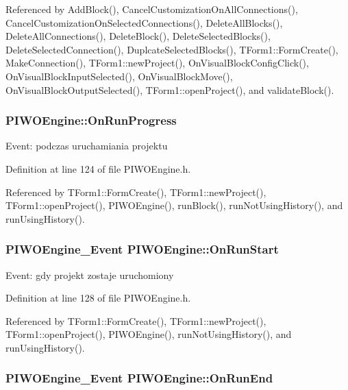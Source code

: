 Referenced by AddBlock(), CancelCustomizationOnAllConnections(), CancelCustomizationOnSelectedConnections(), DeleteAllBlocks(), DeleteAllConnections(), DeleteBlock(), DeleteSelectedBlocks(), DeleteSelectedConnection(), DuplcateSelectedBlocks(), TForm1::FormCreate(), MakeConnection(), TForm1::newProject(), OnVisualBlockConfigClick(), OnVisualBlockInputSelected(), OnVisualBlockMove(), OnVisualBlockOutputSelected(), TForm1::openProject(), and validateBlock().\hypertarget{classPIWOEngine_c300fdccbd5cf4fa9ad200d10856fd3b}{
\subsubsection[OnRunProgress]{ {\bf PIWOEngine::OnRunProgress}}}
\label{classPIWOEngine_c300fdccbd5cf4fa9ad200d10856fd3b}


Event: podczas uruchamiania projektu 

Definition at line 124 of file PIWOEngine.h.

Referenced by TForm1::FormCreate(), TForm1::newProject(), TForm1::openProject(), PIWOEngine(), runBlock(), runNotUsingHistory(), and runUsingHistory().\hypertarget{classPIWOEngine_b5d044c03265cf49fc87e58cd2134749}{
\subsubsection[OnRunStart]{\setlength{\rightskip}{0pt plus 5cm}PIWOEngine\_\-Event {\bf PIWOEngine::OnRunStart}}}
\label{classPIWOEngine_b5d044c03265cf49fc87e58cd2134749}


Event: gdy projekt zostaje uruchomiony 

Definition at line 128 of file PIWOEngine.h.

Referenced by TForm1::FormCreate(), TForm1::newProject(), TForm1::openProject(), PIWOEngine(), runNotUsingHistory(), and runUsingHistory().\hypertarget{classPIWOEngine_7de6e8504739db45b1ba5defeb63d80c}{
\subsubsection[OnRunEnd]{\setlength{\rightskip}{0pt plus 5cm}PIWOEngine\_\-Event {\bf PIWOEngine::OnRunEnd}}}
\label{classPIWOEngine_7de6e8504739db45b1ba5defeb63d80c}


